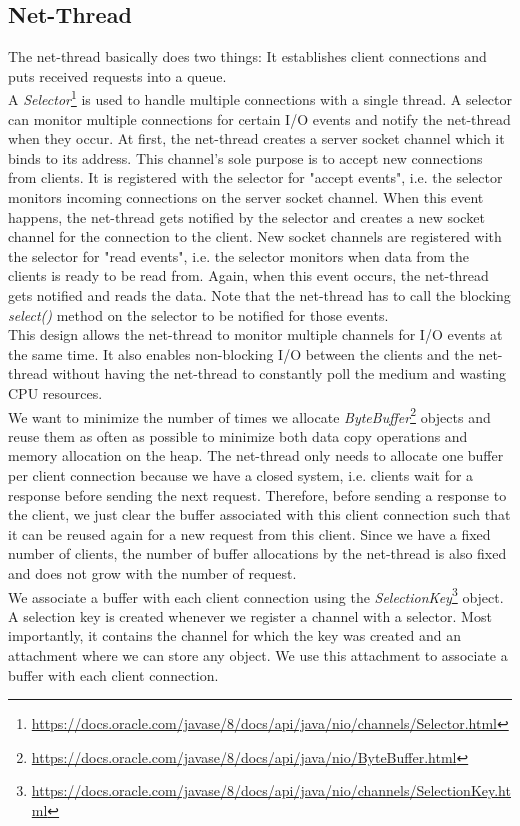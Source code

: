 \subsection{Net-Thread}
The net-thread basically does two things: It establishes client connections and puts received requests into a queue. \\

A \textit{Selector}\footnote{\url{https://docs.oracle.com/javase/8/docs/api/java/nio/channels/Selector.html}} is used to handle multiple connections with a single thread. A selector can monitor multiple connections for certain I/O events and notify the net-thread when they occur. At first, the net-thread creates a server socket channel which it binds to its address. This channel's sole purpose is to accept new connections from clients. It is registered with the selector for "accept events", i.e. the selector monitors incoming connections on the server socket channel. When this event happens, the net-thread gets notified by the selector and creates a new socket channel for the connection to the client. New socket channels are registered with the selector for "read events", i.e. the selector monitors when data from the clients is ready to be read from. Again, when this event occurs, the net-thread gets notified and reads the data. Note that the net-thread has to call the blocking \textit{select()} method on the selector to be notified for those events.\\
This design allows the net-thread to monitor multiple channels for I/O events at the same time. It also enables non-blocking I/O between the clients and the net-thread without having the net-thread to constantly poll the medium and wasting CPU resources. \\

We want to minimize the number of times we allocate \textit{ByteBuffer}\footnote{\url{https://docs.oracle.com/javase/8/docs/api/java/nio/ByteBuffer.html}} objects and reuse them as often as possible to minimize both data copy operations and memory allocation on the heap. The net-thread only needs to allocate one buffer per client connection because we have a closed system, i.e. clients wait for a response before sending the next request. Therefore, before sending a response to the client, we just clear the buffer associated with this client connection such that it can be reused again for a new request from this client. Since we have a fixed number of clients, the number of buffer allocations by the net-thread is also fixed and does not grow with the number of request. \\
We associate a buffer with each client connection using the \textit{SelectionKey}\footnote{\url{https://docs.oracle.com/javase/8/docs/api/java/nio/channels/SelectionKey.html}} object. A selection key is created whenever we register a channel with a selector. Most importantly, it contains the channel for which the key was created and an attachment where we can store any object. We use this attachment to associate a buffer with each client connection. \\

